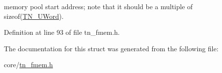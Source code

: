 memory pool start address; note that it should be a multiple of {\ttfamily sizeof(\hyperlink{tn__arch__example_8h_ab80cba0fe9ffcd9011d53dfeb9e39bf4}{T\+N\+\_\+\+U\+Word})}. 



Definition at line 93 of file tn\+\_\+fmem.\+h.



The documentation for this struct was generated from the following file\+:\begin{DoxyCompactItemize}
\item 
core/\hyperlink{tn__fmem_8h}{tn\+\_\+fmem.\+h}\end{DoxyCompactItemize}
